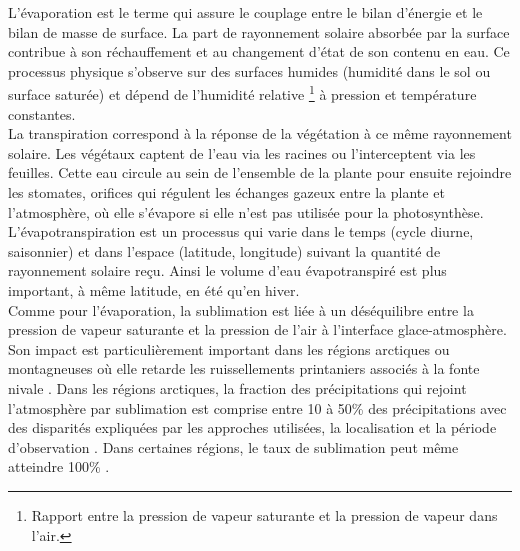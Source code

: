 L’évaporation est le terme qui assure le couplage entre le bilan d'énergie et le bilan de masse de surface. La part de rayonnement solaire absorbée par la surface contribue à son réchauffement et au changement d'état de son contenu en eau. Ce processus physique s'observe sur des surfaces humides (humidité dans le sol ou surface saturée) et dépend de l'humidité relative \footnote{Rapport entre la pression de vapeur saturante et la pression de vapeur dans l'air.} à pression et température constantes. \\
La transpiration correspond à la réponse de la végétation à ce même rayonnement solaire. Les végétaux captent de l'eau via les racines ou l'interceptent via les feuilles. Cette eau circule au sein de l'ensemble de la plante pour ensuite rejoindre les stomates, orifices qui régulent les échanges gazeux entre la plante et l'atmosphère, où elle s'évapore si elle n'est pas utilisée pour la photosynthèse.\\
L'évapotranspiration est un processus qui varie dans le temps (cycle diurne, saisonnier) et dans l'espace (latitude, longitude) suivant la quantité de rayonnement solaire reçu. Ainsi le volume d'eau évapotranspiré est plus important, à même latitude, en été qu'en hiver. \\

Comme pour l'évaporation, la sublimation est liée à un déséquilibre entre la pression de vapeur saturante et la pression de l'air à l'interface glace-atmosphère. Son impact est particulièrement important dans les régions arctiques ou montagneuses où elle retarde les ruissellements printaniers associés à la fonte nivale \citep{box2001,vionnet2014,stigter2018}. Dans les régions arctiques, la fraction des précipitations qui rejoint l'atmosphère par sublimation est comprise entre 10 à 50\% des précipitations avec des disparités expliquées par les approches utilisées, la localisation et la période d'observation \citep{pomeroy1999,groot2013}. Dans certaines régions, le taux de sublimation peut même atteindre 100\% \citep{liston2004}.\\

